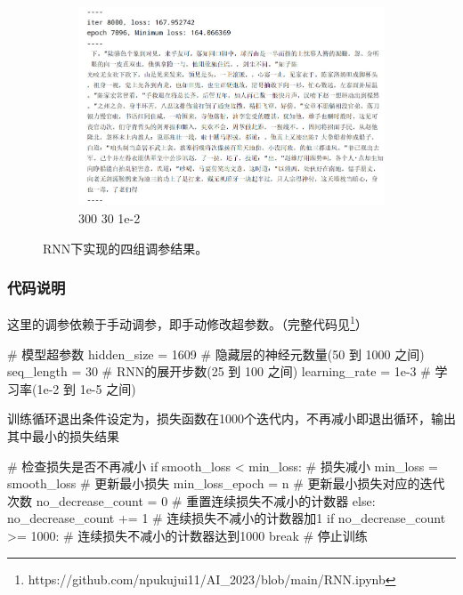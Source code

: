 \documentclass[letterpaper,12pt]{article}
\begin{document}
\begin{figure}[htbp]
				\begin{subfigure}{0.45\textwidth}
					\includegraphics[width=\linewidth]{RNN/result_4}
					\captionsetup{font=scriptsize}
					\caption{300 30 1e-2}
					\label{fig: RNN_result_4}	
				\end{subfigure}
				\captionsetup{font=scriptsize}
				\caption{
					\label{fig: RNN_result} %
						RNN下实现的四组调参结果。
				}
			\end{figure}
			
			
			\subsubsection{代码说明}
	
			这里的调参依赖于手动调参，即手动修改超参数。（完整代码见\footnote{https://github.com/npukujui11/AI\_2023/blob/main/RNN.ipynb}）
			
			\begin{python}
				# 模型超参数
				hidden_size = 1609 # 隐藏层的神经元数量(50 到 1000 之间)
				seq_length = 30 # RNN的展开步数(25 到 100 之间)
				learning_rate = 1e-3 # 学习率(1e-2 到 1e-5 之间)
			\end{python}
			
			
			训练循环退出条件设定为，损失函数在1000个迭代内，不再减小即退出循环，输出其中最小的损失结果
			\begin{python}
				# 检查损失是否不再减小
				if smooth_loss < min_loss:  # 损失减小
				min_loss = smooth_loss  # 更新最小损失
				min_loss_epoch = n  # 更新最小损失对应的迭代次数
				no_decrease_count = 0  # 重置连续损失不减小的计数器
				else:
				no_decrease_count += 1  # 连续损失不减小的计数器加1
				if no_decrease_count >= 1000:  # 连续损失不减小的计数器达到1000
				break  # 停止训练
			\end{python}
			
\end{document}
